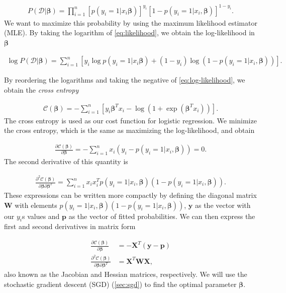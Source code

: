 \documentclass[../main.tex]{subfiles}
\begin{document}
\begin{align}
    P(\mathcal{D}|\boldsymbol{\beta}) = \prod_{i=1}^n[p(y_i=1|x_i\boldsymbol{\beta})]^{y_i}[1-p(y_i=1|x_i,\boldsymbol{\beta})]^{1-y_i}.
    \label{eq:likelihood}
\end{align} We want to maximize this probability by using the maximum likelihood estimator (MLE). By taking the logarithm of \cref{eq:likelihood}, we obtain the log-likelihood in \ensuremath{\boldsymbol{\beta}}

\begin{align}
    \log P(\mathcal{D}|\boldsymbol{\beta}) = \sum_{i=1}^n[y_i\log p(y_i=1|x_i\boldsymbol{\beta})+(1-y_i)\log(1-p(y_i=1|x_i,\boldsymbol{\beta}))].
    \label{eq:log-likelihood}
\end{align}

By reordering the logarithms and taking the negative of \cref{eq:log-likelihood}, we obtain the \textit{cross entropy}

\begin{align}
    \mathcal{C}(\boldsymbol{\beta})=-\sum_{i=1}^n\left[y_i\boldsymbol{\beta}^Tx_i-\log\left(1+\exp\left(\boldsymbol{\beta}^Tx_i\right)\right)\right].
    \label{eq:cross-entropy}
\end{align} The cross entropy is used as our cost function for logistic regression. We minimize the cross entropy, which is the same as maximizing the log-likelihood, and obtain

\begin{align}
    \frac{\partial\mathcal{C}(\boldsymbol{\beta})}{\partial\boldsymbol{\beta}}=-\sum_{i=1}^nx_i(y_i-p(y_i=1|x_i,\boldsymbol{\beta}))=0.
\end{align} The second derivative of this quantity is

\begin{align}
    \frac{\partial^2\mathcal{C}(\boldsymbol{\beta})}{\partial\boldsymbol{\beta}\partial\boldsymbol{\beta}^T}=\sum_{i=1}^nx_ix_i^Tp(y_i=1|x_i,\boldsymbol{\beta})(1-p(y_i=1|x_i,\boldsymbol{\beta})).
\end{align} These expressions can be written more compactly by defining the diagonal matrix \ensuremath{\boldsymbol{W}} with elements \ensuremath{p(y_i=1|x_i,\boldsymbol{\beta})(1-p(y_i=1|x_i,\boldsymbol{\beta}))}, \ensuremath{\boldsymbol{y}} as the vector with our $y_i$s values and \ensuremath{\boldsymbol{p}} as the vector of fitted probabilities. We can then express the first and second derivatives in matrix form

\begin{align}
    \frac{\partial\mathcal{C}(\boldsymbol{\beta})}{\partial\boldsymbol{\beta}}&=-\boldsymbol{X}^T(\boldsymbol{y}-\boldsymbol{p}) \\
    \frac{\partial^2\mathcal{C}(\boldsymbol{\beta})}{\partial\boldsymbol{\beta}\partial\boldsymbol{\beta}^T} &= \boldsymbol{X}^T\boldsymbol{W}\boldsymbol{X},
\end{align} also known as the Jacobian and Hessian matrices, respectively. We will use the stochastic gradient descent (SGD) (\cref{sec:sgd}) to find the optimal parameter \ensuremath{\boldsymbol{\beta}}. 
\end{document}
